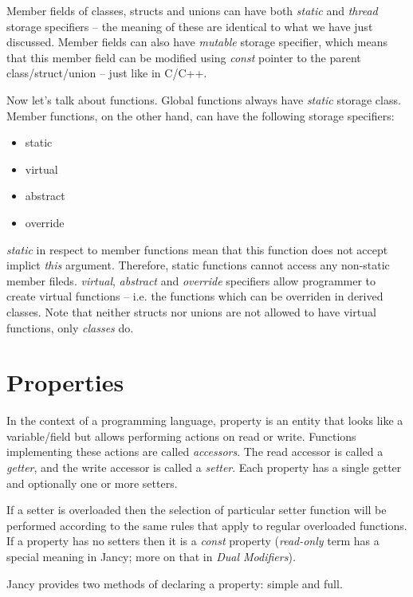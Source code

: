 \documentclass[oneside]{book}
\begin{document}
Member fields of classes, structs and unions can have both \emph{static} and \emph{thread} storage specifiers -- the meaning of these are identical to what we have just discussed. Member fields can also have \emph{mutable} storage specifier, which means that this member field can be modified using \emph{const} pointer to the parent class/struct/union -- just like in C/C++.

Now let's talk about functions. Global functions always have \emph{static} storage class. Member functions, on the other hand, can have the following storage specifiers:

\begin{itemize}
\item static
\item virtual
\item abstract
\item override
\end{itemize}

\emph{static} in respect to member functions mean that this function does not accept implict \emph{this} argument. Therefore, static functions cannot access any non-static member fileds. \emph{virtual}, \emph{abstract} and \emph{override} specifiers allow programmer to create virtual functions -- i.e. the functions which can be overriden in derived classes. Note that neither structs nor unions are not allowed to have virtual functions, only \emph{classes} do.

\section{Properties}

In the context of a programming language, property is an entity that looks like a variable/field but allows performing actions on read or write. Functions implementing these actions are called \emph{accessors}. The read accessor is called a \emph{getter}, and the write accessor is called a \emph{setter}. Each property has a single getter and optionally one or more setters.

If a setter is overloaded then the selection of particular setter function will be performed according to the same rules that apply to regular overloaded functions. If a property has no setters then it is a \emph{const} property (\emph{read-only} term has a special meaning in Jancy; more on that in \emph{Dual Modifiers}).

Jancy provides two methods of declaring a property: simple and full.
\end{document}
